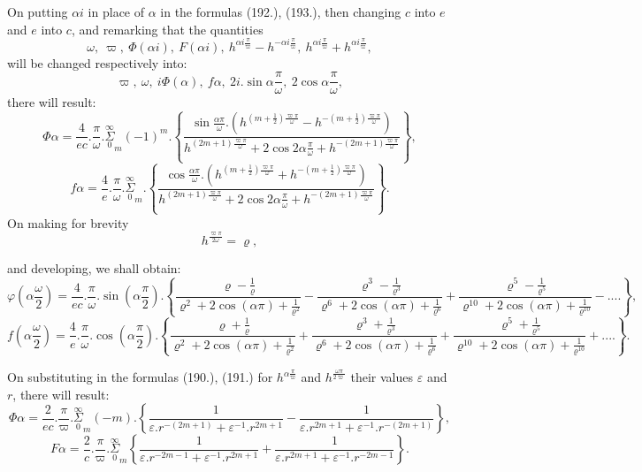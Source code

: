 \documentclass{article}
\begin{document}
On putting $\alpha i$ in place of $\alpha$ in the formulas (192.), (193.), then changing $c$ into $e$ and $e$ into $c$, and remarking that the quantities
\[
\omega,\ \varpi,\ \Phi(\alpha i),\ F(\alpha i),\ h^{\alpha i\frac{\pi}{\varpi}}-h^{-\alpha i\frac{\pi}{\varpi}},\ h^{\alpha i\frac{\pi}{\varpi}}+h^{\alpha i\frac{\pi}{\varpi}},
\]
will be changed respectively into:
\[
\varpi,\ \omega,\ i\Phi(\alpha),\ f\alpha,\ 2i.\sin\alpha\frac{\pi}{\omega},\ 2\cos\alpha\frac{\pi}{\omega},
\]
there will result:
\[
\Phi\alpha = \frac{4}{ec}.\frac{\pi}{\omega}.\overset{\infty}{\underset{0}{\Sigma}}_{m}(-1)^{m}.\left\{\frac{\sin\frac{\alpha\pi}{\omega}.\left(h^{(m+\frac{1}{2})\frac{\varpi\pi}{\omega}}-h^{-(m+\frac{1}{2})\frac{\varpi\pi}{\omega}}\right)}{h^{(2m+1)\frac{\varpi\pi}{\omega}}+2\cos2\alpha\frac{\pi}{\omega}+h^{-(2m+1)\frac{\varpi\pi}{\omega}}}\right\},
\tag{197.}
\]
\[
f\alpha = \frac{4}{e}.\frac{\pi}{\omega}.\overset{\infty}{\underset{0}{\Sigma}}_{m}.\left\{\frac{\cos\frac{\alpha\pi}{\omega}.\left(h^{(m+\frac{1}{2})\frac{\varpi\pi}{\omega}}+h^{-(m+\frac{1}{2})\frac{\varpi\pi}{\omega}}\right)}{h^{(2m+1)\frac{\varpi\pi}{\omega}}+2\cos2\alpha\frac{\pi}{\omega}+h^{-(2m+1)\frac{\varpi\pi}{\omega}}}\right\}.
\tag{198.}
\]
On making for brevity
\[
h^{\frac{\varpi\pi}{2\omega}} = \varrho,
\tag{199.}
\]

and developing, we shall obtain:
\[
\varphi\left(\alpha\frac{\omega}{2}\right) = \frac{4}{ec}.\frac{\pi}{\omega}.\sin\left(\alpha\frac{\pi}{2}\right).\left\{\frac{\varrho-\frac{1}{\varrho}}{\varrho^{2}+2\cos(\alpha\pi)+\frac{1}{\varrho^{2}}}-\frac{\varrho^{3}-\frac{1}{\varrho^{3}}}{\varrho^{6}+2\cos(\alpha\pi)+\frac{1}{\varrho^{6}}}+\frac{\varrho^{5}-\frac{1}{\varrho^{5}}}{\varrho^{10}+2\cos(\alpha\pi)+\frac{1}{\varrho^{10}}}-....\right\},
\tag{200.}
\]
\[
f\left(\alpha\frac{\omega}{2}\right) = \frac{4}{e}.\frac{\pi}{\omega}.\cos\left(\alpha\frac{\pi}{2}\right).\left\{\frac{\varrho+\frac{1}{\varrho}}{\varrho^{2}+2\cos(\alpha\pi)+\frac{1}{\varrho^{2}}}+\frac{\varrho^{3}+\frac{1}{\varrho^{3}}}{\varrho^{6}+2\cos(\alpha\pi)+\frac{1}{\varrho^{6}}}+\frac{\varrho^{5}+\frac{1}{\varrho^{5}}}{\varrho^{10}+2\cos(\alpha\pi)+\frac{1}{\varrho^{10}}}+....\right\}.
\tag{201.}
\]

On substituting in the formulas (190.), (191.) for $h^{\alpha\frac{\pi}{\varpi}}$ and $h^{\frac{\omega\pi}{2\varpi}}$ their values $\varepsilon$ and $r$, there will result:
\[
\Phi\alpha = \frac{2}{ec}.\frac{\pi}{\varpi}.\overset{\infty}{\underset{0}{\Sigma}}_{m}(-m).\left\{\frac{1}{\varepsilon.r^{-(2m+1)}+\varepsilon^{-1}.r^{2m+1}}-\frac{1}{\varepsilon.r^{2m+1}+\varepsilon^{-1}.r^{-(2m+1)}}\right\},
\tag{202.}
\]
\[
F\alpha = \frac{2}{c}.\frac{\pi}{\varpi}.\overset{\infty}{\underset{0}{\Sigma}}_{m}\left\{\frac{1}{\varepsilon.r^{-2m-1}+\varepsilon^{-1}.r^{2m+1}}+\frac{1}{\varepsilon.r^{2m+1}+\varepsilon^{-1}.r^{-2m-1}}\right\}.
\tag{203.}
\]
\end{document}
